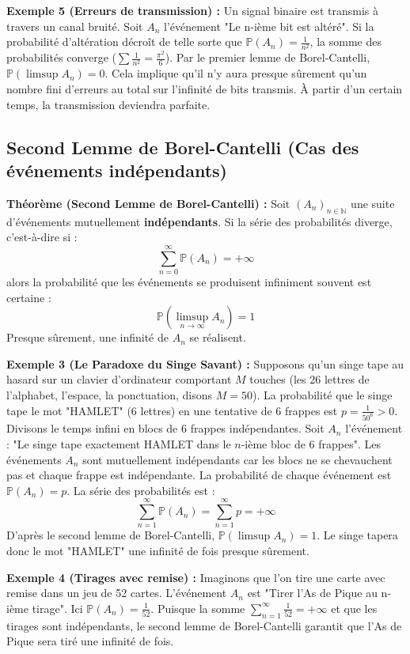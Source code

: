 \documentclass[11pt,a4paper]{article}
\begin{document}
\textbf{Exemple 5 (Erreurs de transmission) :}
Un signal binaire est transmis à travers un canal bruité. Soit $A_n$ l'événement "Le n-ième bit est altéré".
Si la probabilité d'altération décroît de telle sorte que $\mathbb{P}(A_n) = \frac{1}{n^2}$,
la somme des probabilités converge ($\sum \frac{1}{n^2} = \frac{\pi^2}{6}$).
Par le premier lemme de Borel-Cantelli, $\mathbb{P}(\limsup A_n) = 0$.
Cela implique qu'il n'y aura presque sûrement qu'un nombre fini d'erreurs au total sur l'infinité de bits transmis. À partir d'un certain temps, la transmission deviendra parfaite.



\subsection{Second Lemme de Borel-Cantelli (Cas des événements indépendants)}

\textbf{Théorème (Second Lemme de Borel-Cantelli) :}
Soit $(A_n)_{n \in \mathbb{N}}$ une suite d'événements mutuellement \textbf{indépendants}. Si la série des probabilités diverge, c'est-à-dire si :
$$ \sum_{n=0}^\infty \mathbb{P}(A_n) = +\infty $$
alors la probabilité que les événements se produisent infiniment souvent est certaine :
$$ \mathbb{P}\left(\limsup_{n \to \infty} A_n\right) = 1 $$
Presque sûrement, une infinité de $A_n$ se réalisent.

\textbf{Exemple 3 (Le Paradoxe du Singe Savant) :}
Supposons qu'un singe tape au hasard sur un clavier d'ordinateur comportant $M$ touches (les 26 lettres de l'alphabet, l'espace, la ponctuation, disons $M = 50$). La probabilité que le singe tape le mot "HAMLET" (6 lettres) en une tentative de 6 frappes est $p = \frac{1}{50^6} > 0$.
Divisons le temps infini en blocs de 6 frappes indépendantes.
Soit $A_n$ l'événement : "Le singe tape exactement HAMLET dans le $n$-ième bloc de 6 frappes".
Les événements $A_n$ sont mutuellement indépendants car les blocs ne se chevauchent pas et chaque frappe est indépendante.
La probabilité de chaque événement est $\mathbb{P}(A_n) = p$.
La série des probabilités est :
$$ \sum_{n=1}^\infty \mathbb{P}(A_n) = \sum_{n=1}^\infty p = +\infty $$
D'après le second lemme de Borel-Cantelli, $\mathbb{P}(\limsup A_n) = 1$. Le singe tapera donc le mot "HAMLET" une infinité de fois presque sûrement.


\textbf{Exemple 4 (Tirages avec remise) :}
Imaginons que l'on tire une carte avec remise dans un jeu de 52 cartes. L'événement $A_n$ est "Tirer l'As de Pique au n-ième tirage".
Ici $\mathbb{P}(A_n) = \frac{1}{52}$.
Puisque la somme $\sum_{n=1}^\infty \frac{1}{52} = +\infty$ et que les tirages sont indépendants, le second lemme de Borel-Cantelli garantit que l'As de Pique sera tiré une infinité de fois.
\end{document}
